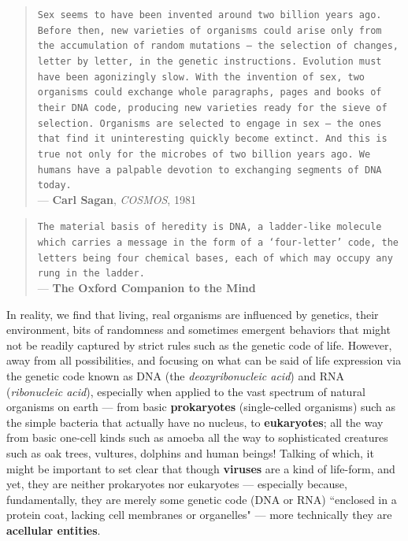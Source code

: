 \documentclass[a4paper, 18pt]{book} %
\begin{document}
\begin{quotation}
\noindent \texttt{Sex seems to have been invented around two billion years ago. Before then, new varieties of organisms could arise only from the accumulation of random mutations --- the selection of changes, letter by letter, in the genetic instructions. Evolution must have been agonizingly slow. With the invention of sex, two organisms could exchange whole paragraphs, pages and books of their DNA code, producing new varieties ready for the sieve of selection. Organisms are selected to engage in sex --- the ones that find it uninteresting quickly become extinct. And this is true not only for the microbes of two billion years ago. We humans have a palpable devotion to exchanging segments of DNA today.}\\
\hspace*{\fill} --- \textbf{Carl Sagan}, \textit{COSMOS}, 1981\cite{sagan1981cosmos}
\end{quotation}


\begin{quotation}
\noindent \texttt{The material basis of heredity is DNA, a ladder-like molecule which carries a message in the form of a `four-letter' code, the letters being four chemical bases, each of which may occupy any rung in the ladder.}\\
\hspace*{\fill} --- \textbf{The Oxford Companion to the Mind}\cite{gregory1987oxford}
\end{quotation}


In reality, we find that living, real organisms are influenced by genetics, their environment, bits of randomness and sometimes emergent behaviors that might not be readily captured by strict rules such as the genetic code of life. However, away from all possibilities, and focusing on what can be said of life expression via the genetic code known as DNA (the \textit{deoxyribonucleic acid}) and RNA (\textit{ribonucleic acid}), especially when applied to the vast spectrum of natural organisms on earth --- from basic \textbf{prokaryotes} (single-celled organisms) such as the simple bacteria that actually have no nucleus\cite{bioexplorer2025}, to  \textbf{eukaryotes}; all the way from basic one-cell kinds such as amoeba\cite{kang2017deep} all the way to sophisticated creatures such as oak trees, vultures, dolphins and human beings! Talking of which, it might be important to set clear that though \textbf{viruses} are a kind of life-form\cite{libretexts2025viruses}, and yet, they are neither prokaryotes nor eukaryotes --- especially because, fundamentally, they are merely some genetic code (DNA or RNA) ``enclosed in a protein coat, lacking cell membranes or organelles"\cite{libretexts2025viruses} --- more technically they are \textbf{acellular entities}.
\end{document}
